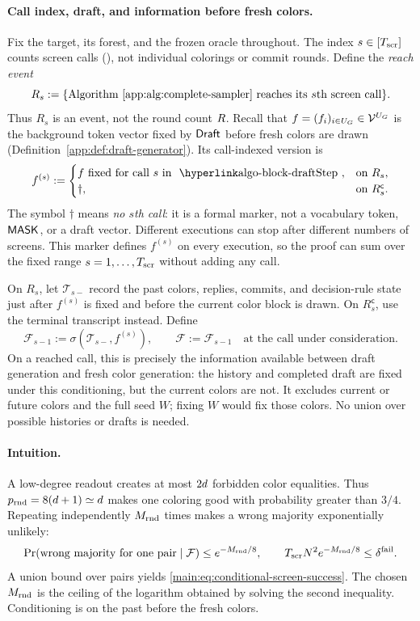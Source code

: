 \paragraph{Call index, draft, and information before fresh colors.}
Fix the target, its forest, and the frozen oracle throughout.
The index $s\in[T_{\mathrm{scr}}]$ counts screen calls
(), not individual colorings or commit rounds.
Define the \emph{reach event}
\[
 R_s:=\{\text{Algorithm~\ref{app:alg:complete-sampler} reaches its $s$th screen call}\}.
\]
Thus $R_s$ is an event, not the round count $R$.
Recall that $f=(f_{i})_{i\in U_{G}}
\in\mathcal V^{U_{G}}$ is the background token vector fixed by
$\mathsf{Draft}$ before fresh colors are drawn
(Definition~\ref{app:def:draft-generator}).  Its call-indexed version is
\[
 f^{(s)}:=
 \begin{cases}
 \DraftFiller\text{ fixed for call }s\text{ in \AlgoBlockRef{draft}},
     &\text{on }R_s,\\
 \dagger,&\text{on }R_s^{\mathsf c}.
 \end{cases}
\]
The symbol $\dagger$ means \emph{no $s$th call}: it is a formal marker,
not a vocabulary token, $\mathsf{MASK}$, or a draft vector.
Different executions can stop after different numbers of screens.
This marker defines $f^{(s)}$ on every execution, so the proof can sum
over the fixed range $s=1,\ldots,T_{\mathrm{scr}}$ without adding any call.

On $R_s$, let $\mathcal T_{s-}$ record the past colors, replies, commits,
and decision-rule state just after $f^{(s)}$ is fixed and before the
current color block is drawn.  On $R_s^{\mathsf c}$, use the terminal
transcript instead.  Define
\[
 \mathcal F_{s-1}:=\sigma(\mathcal T_{s-},f^{(s)}),
 \qquad
 \mathcal F:=\mathcal F_{s-1}\quad\text{at the call under consideration}.
\]
On a reached call, this is precisely the information available between
draft generation and fresh color generation: the history and completed
draft are fixed under this conditioning, but the current colors are not.
It excludes current or future colors and the full seed $W$; fixing $W$
would fix those colors.  No union over possible histories or drafts is needed.

\paragraph{Intuition.}
A low-degree readout creates at most $2d$ forbidden color
equalities.  Thus
$p_{\mathrm{rnd}}=8(d+1)\simeq d$
makes one coloring good with probability greater than $3/4$.
Repeating independently $M_{\mathrm{rnd}}$ times makes a wrong
majority exponentially unlikely:
\[
 \Pr(\hbox{wrong majority for one pair}\mid\mathcal F)
 \le e^{-M_{\mathrm{rnd}}/8},\qquad
 T_{\mathrm{scr}} N^2 e^{-M_{\mathrm{rnd}}/8}\le\delta^{\mathrm{fail}}.
\]
A union bound over pairs yields \cref{main:eq:conditional-screen-success}.
The chosen $M_{\mathrm{rnd}}$ is the ceiling of the logarithm
obtained by solving the second inequality.  Conditioning is on the past before the fresh colors.

